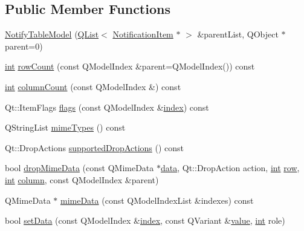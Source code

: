 \subsection*{Public Member Functions}
\begin{DoxyCompactItemize}
\item 
\hyperlink{group__notifyplugin_ga7c99d26f6ccdab1cb80b8cfdfaa9d814}{Notify\-Table\-Model} (\hyperlink{class_q_list}{Q\-List}$<$ \hyperlink{class_notification_item}{Notification\-Item} $\ast$ $>$ \&parent\-List, Q\-Object $\ast$parent=0)
\item 
\hyperlink{ioapi_8h_a787fa3cf048117ba7123753c1e74fcd6}{int} \hyperlink{group__notifyplugin_ga2bd35c3c39b4a7c057e00786a7ece129}{row\-Count} (const Q\-Model\-Index \&parent=Q\-Model\-Index()) const 
\item 
\hyperlink{ioapi_8h_a787fa3cf048117ba7123753c1e74fcd6}{int} \hyperlink{group__notifyplugin_gaf90f7b29e6b11f9e569df9adf0c0f01f}{column\-Count} (const Q\-Model\-Index \&) const 
\item 
Qt\-::\-Item\-Flags \hyperlink{group__notifyplugin_ga19b5a3d99feb4907b2332962b1468b9f}{flags} (const Q\-Model\-Index \&\hyperlink{glext_8h_ab47dd9958bcadea08866b42bf358e95e}{index}) const 
\item 
Q\-String\-List \hyperlink{group__notifyplugin_ga8f52bed133220f83210db9d483d6aa26}{mime\-Types} () const 
\item 
Qt\-::\-Drop\-Actions \hyperlink{group__notifyplugin_gac83d6e04277e98b87cb42b0ab9b3c9be}{supported\-Drop\-Actions} () const 
\item 
bool \hyperlink{group__notifyplugin_ga623fe8a3346c4c0565352170fc44c4a9}{drop\-Mime\-Data} (const Q\-Mime\-Data $\ast$\hyperlink{glext_8h_a8850df0785e6fbcc2351af3b686b8c7a}{data}, Qt\-::\-Drop\-Action action, \hyperlink{ioapi_8h_a787fa3cf048117ba7123753c1e74fcd6}{int} \hyperlink{glext_8h_a11b277b422822f784ee248b43eee3e1e}{row}, \hyperlink{ioapi_8h_a787fa3cf048117ba7123753c1e74fcd6}{int} \hyperlink{glext_8h_a3b58c39b1b7ca6f4012b27e84de3bdb3}{column}, const Q\-Model\-Index \&parent)
\item 
Q\-Mime\-Data $\ast$ \hyperlink{group__notifyplugin_gad898510a85b3055557ed33dc8e319b51}{mime\-Data} (const Q\-Model\-Index\-List \&indexes) const 
\item 
bool \hyperlink{group__notifyplugin_gafd2c78e02d0c8123cc83714a3a5ce595}{set\-Data} (const Q\-Model\-Index \&\hyperlink{glext_8h_ab47dd9958bcadea08866b42bf358e95e}{index}, const Q\-Variant \&\hyperlink{glext_8h_aa0e2e9cea7f208d28acda0480144beb0}{value}, \hyperlink{ioapi_8h_a787fa3cf048117ba7123753c1e74fcd6}{int} role)

\end{DoxyCompactItemize}

